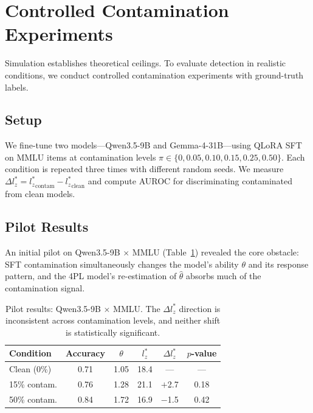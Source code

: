 \documentclass[11pt]{article}
\begin{document}
\section{Controlled Contamination Experiments}
\label{sec:controlled}

Simulation establishes theoretical ceilings. To evaluate detection in realistic conditions, we conduct controlled contamination experiments with ground-truth labels.

\subsection{Setup}

We fine-tune two models---Qwen3.5-9B and Gemma-4-31B---using QLoRA SFT on MMLU items at contamination levels $\pi \in \{0, 0.05, 0.10, 0.15, 0.25, 0.50\}$.
Each condition is repeated three times with different random seeds.
We measure $\Delta l_z^* = {l_z^*}_{\text{contam}} - {l_z^*}_{\text{clean}}$ and compute AUROC for discriminating contaminated from clean models.

\subsection{Pilot Results}

An initial pilot on Qwen3.5-9B $\times$ MMLU (Table~\ref{tab:pilot}) revealed the core obstacle: SFT contamination simultaneously changes the model's ability $\theta$ and its response pattern, and the 4PL model's re-estimation of $\hat{\theta}$ absorbs much of the contamination signal.

\begin{table}[t]
\centering
\caption{Pilot results: Qwen3.5-9B $\times$ MMLU. The $\Delta l_z^*$ direction is inconsistent across contamination levels, and neither shift is statistically significant.}
\label{tab:pilot}
\begin{tabular}{lccccc}
\toprule
Condition & Accuracy & $\theta$ & $l_z^*$ & $\Delta l_z^*$ & $p$-value \\
\midrule
Clean (0\%)  & 0.71 & 1.05 & 18.4 & ---   & --- \\
15\% contam. & 0.76 & 1.28 & 21.1 & $+$2.7  & 0.18 \\
50\% contam. & 0.84 & 1.72 & 16.9 & $-$1.5  & 0.42 \\
\bottomrule
\end{tabular}
\end{table}
\end{document}
